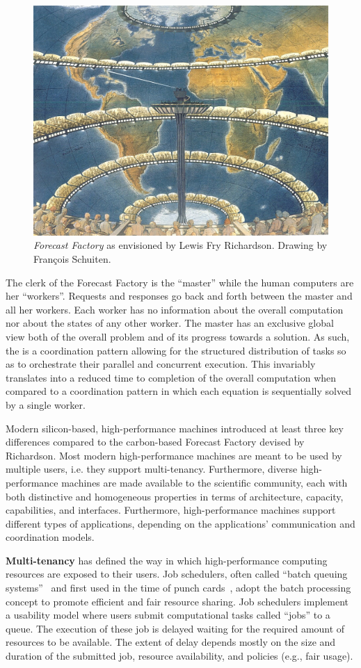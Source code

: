 \documentclass{sig-alternate}
\begin{document}
\begin{figure}[t]
  \centering
    \includegraphics[width=.45\textwidth]{figures/forecast-factory.jpg}
  \caption{\textit{Forecast Factory} as envisioned by Lewis Fry Richardson.
    Drawing by Fran{\c c}ois Schuiten.}
  \label{fig:forecast_factory}
\end{figure}

The clerk of the Forecast Factory is the ``master'' while the human computers
are her ``workers''. Requests and responses go back and forth between the master
and all her workers. Each worker has no information about the overall
computation nor about the states of any other worker. The master has an
exclusive global view both of the overall problem and of its progress towards a
solution. As such, the {\bf \MW} is a coordination pattern allowing for the
structured distribution of tasks so as to orchestrate their parallel and
concurrent execution. This invariably translates into a reduced time to
completion of the overall computation when compared to a coordination pattern in
which each equation is sequentially solved by a single worker.

Modern silicon-based, high-performance machines introduced at least three key
differences compared to the carbon-based Forecast Factory devised by
Richardson. Most modern high-performance machines are meant to be used by
multiple users, i.e. they support multi-tenancy. Furthermore, diverse
high-performance machines are made available to the scientific community, each
with both distinctive and homogeneous properties in terms of architecture,
capacity, capabilities, and interfaces. Furthermore, high-performance machines
support different types of applications, depending on the applications'
communication and coordination models.

{\bf Multi-tenancy} has defined the way in which high-performance computing
resources are exposed to their users. Job schedulers, often called ``batch
queuing systems''~\cite{czajkowski1998} and first used in the time of punch
cards~\cite{katz1966,silberschatz1998}, adopt the batch processing concept to
promote efficient and fair resource sharing. Job schedulers implement a
usability model where users submit computational tasks called ``jobs'' to a
queue. The execution of these job is delayed waiting for the required amount of
resources to be available. The extent of delay depends mostly on the size and
duration of the submitted job, resource availability, and policies (e.g., fair
usage).
\end{document}
